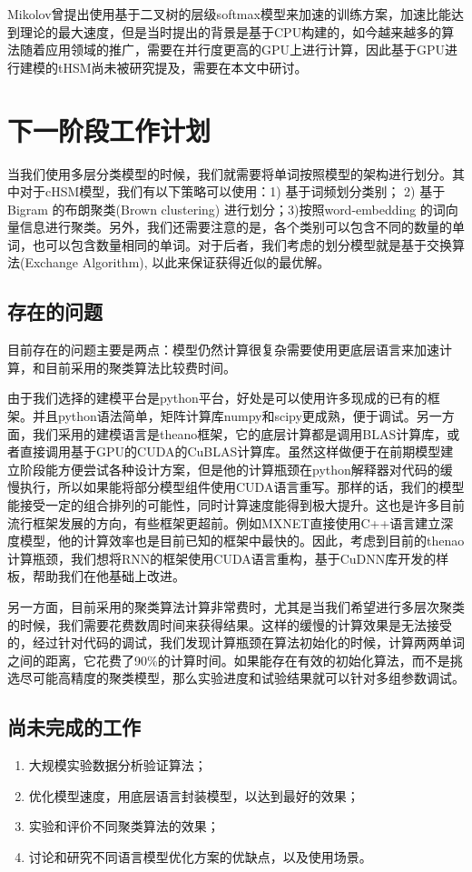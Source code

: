 \documentclass[master,openright,twoside,color]{buaathesis}
\begin{document}
Mikolov曾提出使用基于二叉树的层级softmax模型来加速的训练方案，加速比能达到理论的最大速度，但是当时提出的背景是基于CPU构建的，如今越来越多的算法随着应用领域的推广，需要在并行度更高的GPU上进行计算，因此基于GPU进行建模的tHSM尚未被研究提及，需要在本文中研讨。
\section{下一阶段工作计划}
当我们使用多层分类模型的时候，我们就需要将单词按照模型的架构进行划分。其中对于cHSM模型，我们有以下策略可以使用：1) 基于词频划分类别； 2) 基于Bigram 的布朗聚类(Brown clustering) 进行划分；3)按照word-embedding 的词向量信息进行聚类。另外，我们还需要注意的是，各个类别可以包含不同的数量的单词，也可以包含数量相同的单词。对于后者，我们考虑的划分模型就是基于交换算法(Exchange Algorithm), 以此来保证获得近似的最优解。

\subsection{存在的问题}
目前存在的问题主要是两点：模型仍然计算很复杂需要使用更底层语言来加速计算，和目前采用的聚类算法比较费时间。

由于我们选择的建模平台是python平台，好处是可以使用许多现成的已有的框架。并且python语法简单，矩阵计算库numpy和scipy更成熟，便于调试。另一方面，我们采用的建模语言是theano框架，它的底层计算都是调用BLAS计算库，或者直接调用基于GPU的CUDA的CuBLAS计算库。虽然这样做便于在前期模型建立阶段能方便尝试各种设计方案，但是他的计算瓶颈在python解释器对代码的缓慢执行，所以如果能将部分模型组件使用CUDA语言重写。那样的话，我们的模型能接受一定的组合排列的可能性，同时计算速度能得到极大提升。这也是许多目前流行框架发展的方向，有些框架更超前。例如MXNET直接使用C++语言建立深度模型，他的计算效率也是目前已知的框架中最快的。因此，考虑到目前的thenao计算瓶颈，我们想将RNN的框架使用CUDA语言重构，基于CuDNN库开发的样板，帮助我们在他基础上改进。

另一方面，目前采用的聚类算法计算非常费时，尤其是当我们希望进行多层次聚类的时候，我们需要花费数周时间来获得结果。这样的缓慢的计算效果是无法接受的，经过针对代码的调试，我们发现计算瓶颈在算法初始化的时候，计算两两单词之间的距离，它花费了90\%的计算时间。如果能存在有效的初始化算法，而不是挑选尽可能高精度的聚类模型，那么实验进度和试验结果就可以针对多组参数调试。
\subsection{尚未完成的工作}
\begin{enumerate}
\item 大规模实验数据分析验证算法；
\item 优化模型速度，用底层语言封装模型，以达到最好的效果；
\item 实验和评价不同聚类算法的效果；
\item 讨论和研究不同语言模型优化方案的优缺点，以及使用场景。
\end{enumerate}
\end{document}
